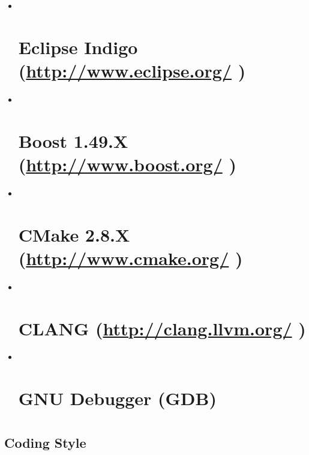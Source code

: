 \documentclass[a4paper,11pt,twoside,pdftex,draft]{article}
\begin{document}
\begin{itemize}
\item ~
  \hypertarget{eclipse-indigo-httpwww.eclipse.org}{%
  \section[Eclipse Indigo (\url{http://www.eclipse.org/}
  )]{\texorpdfstring{\protect\hypertarget{anchor-13}{}{}Eclipse Indigo
  (\url{http://www.eclipse.org/}
  )}{Eclipse Indigo (http://www.eclipse.org/ )}}\label{eclipse-indigo-httpwww.eclipse.org}}
\item ~
  \hypertarget{boost-1.49.x-httpwww.boost.org}{%
  \section{\texorpdfstring{Boost 1.49.X (\url{http://www.boost.org/}
  )}{Boost 1.49.X (http://www.boost.org/ )}}\label{boost-1.49.x-httpwww.boost.org}}
\item ~
  \hypertarget{cmake-2.8.x-httpwww.cmake.org}{%
  \section{\texorpdfstring{CMake 2.8.X (\url{http://www.cmake.org/}
  )}{CMake 2.8.X (http://www.cmake.org/ )}}\label{cmake-2.8.x-httpwww.cmake.org}}
\item ~
  \hypertarget{clang-httpclang.llvm.org}{%
  \section{\texorpdfstring{CLANG (\url{http://clang.llvm.org/}
  )}{CLANG (http://clang.llvm.org/ )}}\label{clang-httpclang.llvm.org}}
\item ~
  \hypertarget{gnu-debugger-gdb}{%
  \section{GNU Debugger (GDB)}\label{gnu-debugger-gdb}}
\end{itemize}

\hypertarget{section-5}{%
\section{}\label{section-5}}

\hypertarget{coding-style}{%
\subsection[Coding
Style]{\texorpdfstring{\protect\hypertarget{anchor-14}{}{}Coding
Style}{Coding Style}}\label{coding-style}}
\end{document}
